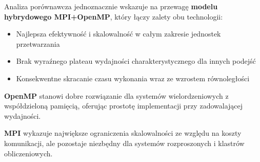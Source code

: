 \documentclass[12pt,a4paper]{report}
\begin{document}
Analiza porównawcza jednoznacznie wskazuje na przewagę \textbf{modelu hybrydowego MPI+OpenMP}, który łączy zalety obu technologii:
\begin{itemize}
    \item Najlepsza efektywność i skalowalność w całym zakresie jednostek przetwarzania
    \item Brak wyraźnego plateau wydajności charakterystycznego dla innych podejść
    \item Konsekwentne skracanie czasu wykonania wraz ze wzrostem równoległości
\end{itemize}

\textbf{OpenMP} stanowi dobre rozwiązanie dla systemów wielordzeniowych z współdzieloną pamięcią, oferując prostotę implementacji przy zadowalającej wydajności.

\textbf{MPI} wykazuje największe ograniczenia skalowalności ze względu na koszty komunikacji, ale pozostaje niezbędny dla systemów rozproszonych i klastrów obliczeniowych.
\end{document}
